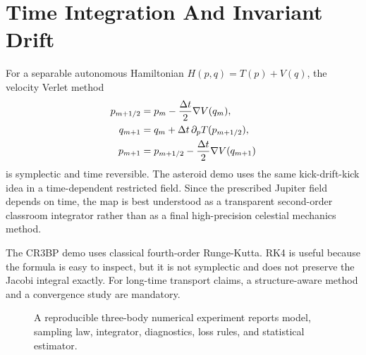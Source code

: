 \section{Time Integration And Invariant Drift}
\label{sec:three-body-time-integration-protocol}

For a separable autonomous Hamiltonian \(H(p,q)=T(p)+V(q)\), the velocity
Verlet method
\[
\begin{aligned}
        p_{m+1/2}&=p_m-\frac{\Delta t}{2}\nabla V(q_m),\\
        q_{m+1}&=q_m+\Delta t\,\partial_pT(p_{m+1/2}),\\
        p_{m+1}&=p_{m+1/2}-\frac{\Delta t}{2}\nabla V(q_{m+1})
\end{aligned}
\]
is symplectic and time reversible.  The asteroid demo uses the same
kick-drift-kick idea in a time-dependent restricted field.  Since the
prescribed Jupiter field depends on time, the map is best understood as a
transparent second-order classroom integrator rather than as a final
high-precision celestial mechanics method.

The CR3BP demo uses classical fourth-order Runge-Kutta.  RK4 is useful because
the formula is easy to inspect, but it is not symplectic and does not preserve
the Jacobi integral exactly.  For long-time transport claims, a structure-aware
method and a convergence study are mandatory.

\begin{figure}[htbp]
\centering
{}
\caption{A reproducible three-body numerical experiment reports model,
sampling law, integrator, diagnostics, loss rules, and statistical estimator.}
\label{fig:three-body-numerical-pipeline}
\end{figure}

